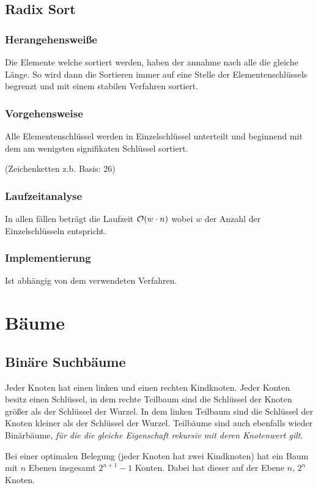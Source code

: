 \documentclass[10pt,a4paper]{article}
\begin{document}
\begin{multicols*}{4}
\subsection{Radix Sort}
\subsubsection*{Herangehensweiße}
Die Elemente welche sortiert werden, haben der annahme nach alle die gleiche Länge. So wird dann die Sortieren immer auf
eine Stelle der Elementenschlüssels begrenzt und mit einem stabilen Verfahren sortiert.
\subsubsection*{Vorgehensweise}
Alle Elementenschlüssel werden in Einzelschlüssel unterteilt und beginnend mit dem am wenigsten signifikaten Schlüssel
sortiert.

(Zeichenketten z.b. Basis: 26)
\subsubsection*{Laufzeitanalyse}
In allen fällen beträgt die Laufzeit \(\mathcal{O}(w \cdot n)\) wobei \(w\) der Anzahl der Einzelschlüsseln entspricht.
\subsubsection*{Implementierung}
Ist abhängig von dem verwendeten Verfahren.

\section{Bäume}

\subsection{Binäre Suchbäume}
Jeder Knoten hat einen linken und einen rechten Kindknoten. Jeder Konten besitz einen Schlüssel, in dem rechte
Teilbaum sind die Schlüssel der Knoten größer als der Schlüssel der Wurzel. In dem linken Teilbaum sind die
Schlüssel der Knoten kleiner als der Schlüssel der Wurzel. Teilbäume sind auch ebenfalls wieder Binärbäume,
\emph{für die die gleiche Eigenschaft rekursiv mit deren Knotenwert gilt}.

Bei einer optimalen Belegung (jeder Knoten hat zwei Kindknoten) hat ein Baum mit \(n\) Ebenen insgesamt
\(2^{n+1} - 1\) Konten. Dabei hat dieser auf der Ebene \(n\), \(2^{n}\) Knoten.


\end{multicols*}
\end{document}

